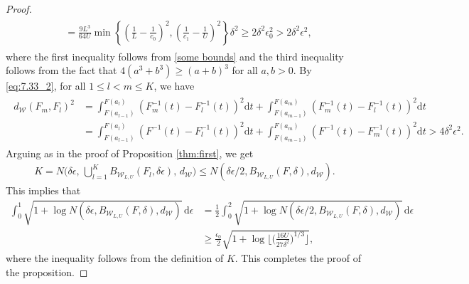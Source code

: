\documentclass[10pt,a4paper]{amsart}
\begin{document}
\begin{proof}
\begin{align}
\begin{split}
        & = \frac{9L^3}{64U} \min \left\{ \left( \frac{1}{L} - \frac{1}{c_0} \right)^2, \left( \frac{1}{c_1} - \frac{1}{U} \right)^2 \right\} \delta^2 \ge 2 \delta^2 \epsilon_0^2 > 2 \delta^2 \epsilon^2,
    \end{split} \end{align}
    where the first inequality follows from \eqref{some bounds} and the third inequality follows from the fact that $4(a^3+b^3)\ge(a+b)^3$ for all $a,b>0$.
    By \eqref{eq:7.33_2}, for all $1\leq l<m\leq K$, we have
    \begin{align}\begin{split} \label{eq:7.33_3}
        d_{\mathcal{W}} \left( F_m,  F_l \right)^2
        & = \int_{F(a_{l-1})}^{F(a_l)} \left( F^{-1}_m(t) - F_l^{-1}(t) \right)^2 \mathrm{d}t + \int_{F(a_{m-1})}^{F(a_m)} \left( F^{-1}_m(t) - F_l^{-1}(t) \right)^2 \mathrm{d}t \\
        & = \int_{F(a_{l-1})}^{F(a_l)} \left( F^{-1}(t) - F_l^{-1}(t) \right)^2 \mathrm{d}t + \int_{F(a_{m-1})}^{F(a_m)} \left( F^{-1}(t) - F_m^{-1}(t) \right)^2 \mathrm{d}t > 4 \delta^2 \epsilon^2.
    \end{split} \end{align}
    Arguing as in the proof of Proposition \ref{thm:first}, we get
    \begin{align*}
        K=N\Big(\delta\epsilon,\,\bigcup_{l=1}^K B_{\mathcal{W}_{L, U}}(F_l, \delta \epsilon),\,d_{\mathcal{W}}\Big) \le N(\delta\epsilon/2,B_{\mathcal{W}_{L, U}}(F, \delta),d_{\mathcal{W}}).
    \end{align*}
    This implies that
    \begin{align*}
        \int_{0}^{1} \sqrt{1+\log N(\delta \epsilon, B_{\mathcal{W}_{L, U}}(F, \delta), d_{\mathcal{W}})} \, \mathrm{d} \epsilon
        &= \frac{1}{2} \int_{0}^2 \sqrt{1+\log N(\delta \epsilon/2, B_{\mathcal{W}_{L, U}}(F, \delta), d_{\mathcal{W}})} \, \mathrm{d} \epsilon \\
        &\ge \frac{\epsilon_0}{2}\sqrt{1+\log\Big\lfloor\Big(\frac{16U}{27\delta^2}\Big)^{1/3}\Big\rfloor},
    \end{align*}
    where the inequality follows from the definition of $K$. This completes the proof of the proposition.
\end{proof}
\end{document}
